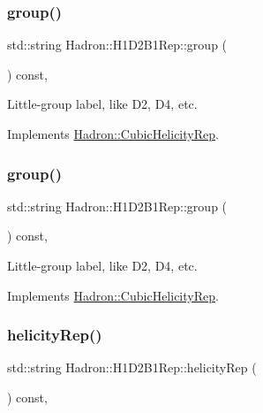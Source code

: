 \subsubsection{\texorpdfstring{group()}{group()}\hspace{0.1cm}{\footnotesize\ttfamily [2/3]}}
{\footnotesize\ttfamily std\+::string Hadron\+::\+H1\+D2\+B1\+Rep\+::group (\begin{DoxyParamCaption}{ }\end{DoxyParamCaption}) const\hspace{0.3cm}{\ttfamily [inline]}, {\ttfamily [virtual]}}

Little-\/group label, like D2, D4, etc. 

Implements \mbox{\hyperlink{structHadron_1_1CubicHelicityRep_a101a7d76cd8ccdad0f272db44b766113}{Hadron\+::\+Cubic\+Helicity\+Rep}}.

\mbox{\label{structHadron_1_1H1D2B1Rep_a18b7522e1d6bfeeb4abf011f7e6def9a}} 
\subsubsection{\texorpdfstring{group()}{group()}\hspace{0.1cm}{\footnotesize\ttfamily [3/3]}}
{\footnotesize\ttfamily std\+::string Hadron\+::\+H1\+D2\+B1\+Rep\+::group (\begin{DoxyParamCaption}{ }\end{DoxyParamCaption}) const\hspace{0.3cm}{\ttfamily [inline]}, {\ttfamily [virtual]}}

Little-\/group label, like D2, D4, etc. 

Implements \mbox{\hyperlink{structHadron_1_1CubicHelicityRep_a101a7d76cd8ccdad0f272db44b766113}{Hadron\+::\+Cubic\+Helicity\+Rep}}.

\mbox{\label{structHadron_1_1H1D2B1Rep_ac8a7ff273c48151c27ea9e299bc99715}} 
\subsubsection{\texorpdfstring{helicityRep()}{helicityRep()}\hspace{0.1cm}{\footnotesize\ttfamily [1/2]}}
{\footnotesize\ttfamily std\+::string Hadron\+::\+H1\+D2\+B1\+Rep\+::helicity\+Rep (\begin{DoxyParamCaption}{ }\end{DoxyParamCaption}) const\hspace{0.3cm}{\ttfamily [inline]}, {\ttfamily [virtual]}}

